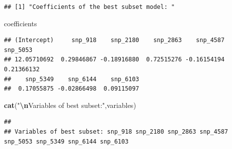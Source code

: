 \documentclass[
]{article}
\newenvironment{Shaded}{\begin{snugshade}}{\end{snugshade}}
\newcommand{\ConstantTok}[1]{\textcolor[rgb]{0.56,0.35,0.01}{#1}}
\newcommand{\DecValTok}[1]{\textcolor[rgb]{0.00,0.00,0.81}{#1}}
\newcommand{\FunctionTok}[1]{\textcolor[rgb]{0.13,0.29,0.53}{\textbf{#1}}}
\newcommand{\NormalTok}[1]{#1}
\newcommand{\OtherTok}[1]{\textcolor[rgb]{0.56,0.35,0.01}{#1}}
\newcommand{\SpecialCharTok}[1]{\textcolor[rgb]{0.81,0.36,0.00}{\textbf{#1}}}
\newcommand{\StringTok}[1]{\textcolor[rgb]{0.31,0.60,0.02}{#1}}
\begin{document}
\begin{Shaded}
\end{Shaded}

\begin{verbatim}
## [1] "Coefficients of the best subset model: "
\end{verbatim}

\begin{Shaded}
\begin{Highlighting}[]
\NormalTok{coefficients}
\end{Highlighting}
\end{Shaded}

\begin{verbatim}
## (Intercept)     snp_918    snp_2180    snp_2863    snp_4587    snp_5053 
## 12.05710692  0.29846867 -0.18916880  0.72515276 -0.16154194  0.21366132 
##    snp_5349    snp_6144    snp_6103 
##  0.17055875 -0.02866498  0.09115097
\end{verbatim}

\begin{Shaded}
\begin{Highlighting}[]
\FunctionTok{cat}\NormalTok{(}\StringTok{"}\SpecialCharTok{\textbackslash{}n}\StringTok{Variables of best subset:"}\NormalTok{,variables)}
\end{Highlighting}
\end{Shaded}

\begin{verbatim}
## 
## Variables of best subset: snp_918 snp_2180 snp_2863 snp_4587 snp_5053 snp_5349 snp_6144 snp_6103
\end{verbatim}
\end{document}
